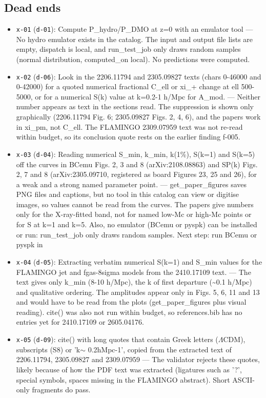 \documentclass[11pt,a4paper]{article}
\begin{document}
\subsection{Dead ends}
\begin{itemize}
  \item \texttt{x-01} (\texttt{d-01}): Compute P\_hydro/P\_DMO at z=0 with an emulator tool --- No hydro emulator exists in the catalog. The input and output file lists are empty, dispatch is local, and run\_test\_job only draws random samples (normal distribution, computed\_on local). No predictions were computed.
  \item \texttt{x-02} (\texttt{d-06}): Look in the 2206.11794 and 2305.09827 texts (chars 0-46000 and 0-42000) for a quoted numerical fractional C\_ell or xi\_+ change at ell 500-5000, or for a numerical S(k) value at k=0.2-1 h/Mpc for A\_mod. --- Neither number appears as text in the sections read. The suppression is shown only graphically (2206.11794 Fig. 6; 2305.09827 Figs. 2, 4, 6), and the papers work in xi\_pm, not C\_ell. The FLAMINGO 2309.07959 text was not re-read within budget, so its conclusion quote rests on the earlier finding f-005.
  \item \texttt{x-03} (\texttt{d-04}): Reading numerical S\_min, k\_min, k(1\%), S(k=1) and S(k=5) off the curves in BCemu Figs. 2, 3 and 8 (arXiv:2108.08863) and SP(k) Figs. 2, 7 and 8 (arXiv:2305.09710, registered as board Figures 23, 25 and 26), for a weak and a strong named parameter point. --- get\_paper\_figures saves PNG files and captions, but no tool in this catalog can view or digitise images, so values cannot be read from the curves. The papers give numbers only for the X-ray-fitted band, not for named low-Mc or high-Mc points or for S at k=1 and k=5. Also, no emulator (BCemu or pyspk) can be installed or run: run\_test\_job only draws random samples. Next step: run BCemu or pyspk in 
  \item \texttt{x-04} (\texttt{d-05}): Extracting verbatim numerical S(k=1) and S\_min values for the FLAMINGO jet and fgas-8sigma models from the 2410.17109 text. --- The text gives only k\_min (8-10 h/Mpc), the k of first departure (\textasciitilde{}0.1 h/Mpc) and qualitative ordering. The amplitudes appear only in Figs. 5, 6, 11 and 13 and would have to be read from the plots (get\_paper\_figures plus visual reading). cite() was also not run within budget, so references.bib has no entries yet for 2410.17109 or 2605.04176.
  \item \texttt{x-05} (\texttt{d-09}): cite() with long quotes that contain Greek letters ($\Lambda$CDM), subscripts (S8) or 'k$\sim$ 0.2hMpc-1', copied from the extracted text of 2206.11794, 2305.09827 and 2309.07959 --- The validator rejects these quotes, likely because of how the PDF text was extracted (ligatures such as '?', special symbols, spaces missing in the FLAMINGO abstract). Short ASCII-only fragments do pass.

\end{itemize}
\end{document}

